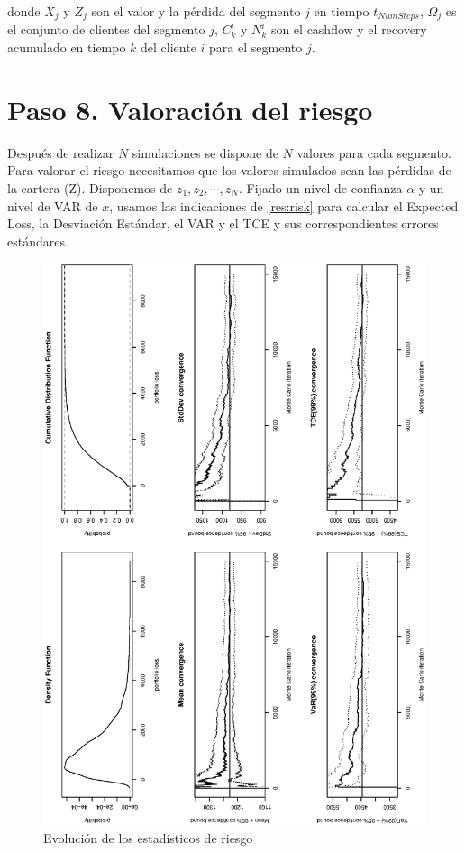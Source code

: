 donde $X_j$ y $Z_j$ son el valor y la p\'erdida del segmento $j$ en tiempo $t_{NumSteps}$,
$\Omega_j$ es el conjunto de clientes del segmento $j$, $C_k^i$ y $N_k^i$ son el cashflow
y el recovery acumulado en tiempo $k$ del cliente $i$ para el segmento $j$.


\section{Paso 8. Valoraci\'on del riesgo}

Despu\'es de realizar $N$ simulaciones se dispone de $N$ valores para cada
segmento. Para valorar el riesgo necesitamos que los valores simulados sean
las p\'erdidas de la cartera (Z). Disponemos de $z_1, z_2, \cdots, z_N$. Fijado un
nivel de confianza $\alpha$ y un nivel de VAR de $x$, usamos las indicaciones de
\ref{res:risk} para calcular el Expected Loss, la Desviaci\'on Est\'andar, el VAR y
el TCE y sus correspondientes errores est\'andares.

\begin{figure}[!hb]
\begin{center}
\includegraphics[width=12cm,angle=0]{./images/report.eps}
\caption{Evoluci\'on de los estad\'isticos de riesgo}
\label{timetranches}
\end{center}
\end{figure}
